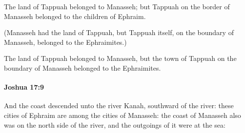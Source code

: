 			\begin{versebox}
					\item[BHS] 
					\item[ASV] The land of Tappuah belonged to Manasseh; but Tappuah on the border of Manasseh belonged to the children of Ephraim.
					\item[NIV] (Manasseh had the land of Tappuah, but Tappuah itself, on the boundary of Manasseh, belonged to the Ephraimites.)
					\item[NRSV] The land of Tappuah belonged to Manasseh, but the town of Tappuah on the boundary of Manasseh belonged to the Ephraimites.
			\end{versebox}

		\paragraph{Joshua 17:9} %
			\label{JOSHUA-17-9}

			And the coast descended unto the river Kanah, southward of the river: these cities of Ephraim are among the cities of Manasseh: the coast of Manasseh also was on the north side of the river, and the outgoings of it were at the sea:

